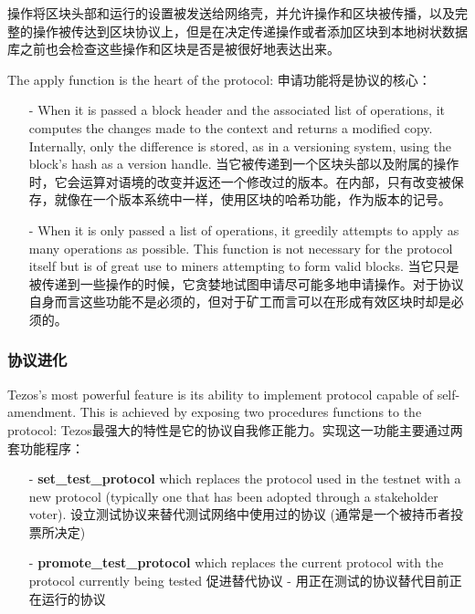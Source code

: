 \documentclass[letterpaper]{article}
\begin{document}
操作将区块头部和运行的设置被发送给网络壳，并允许操作和区块被传播，以及完整的操作被传达到区块协议上，但是在决定传递操作或者添加区块到本地树状数据库之前也会检查这些操作和区块是否是被很好地表达出来。

The apply function is the heart of the protocol:
申请功能将是协议的核心：

\begin{itemize}
\item[-]When it is passed a block header and the associated list of operations,
it computes the changes made to the context and returns a modified copy.
Internally, only the difference is stored, as in a versioning system,
using the block's hash as a version handle.
当它被传递到一个区块头部以及附属的操作时，它会运算对语境的改变并返还一个修改过的版本。在内部，只有改变被保存，就像在一个版本系统中一样，使用区块的哈希功能，作为版本的记号。
\item[-]When it is only passed a list of operations, it greedily attempts
to apply as many operations as possible. This function is not necessary for the
protocol itself but is of great use to miners attempting to form valid blocks.
当它只是被传递到一些操作的时候，它贪婪地试图申请尽可能多地申请操作。对于协议自身而言这些功能不是必须的，但对于矿工而言可以在形成有效区块时却是必须的。
\end{itemize}

\subsubsection{协议进化}

Tezos's most powerful feature is its ability to implement protocol capable
of self-amendment. This is achieved by exposing two procedures functions to the
protocol:
Tezos最强大的特性是它的协议自我修正能力。实现这一功能主要通过两套功能程序：

\begin{itemize}
\item[-] \textbf{set\_test\_protocol} which replaces the protocol
used in the testnet with a new protocol (typically one that has been adopted
through a stakeholder voter).
设立测试协议来替代测试网络中使用过的协议 (通常是一个被持币者投票所决定)
\item[-] \textbf{promote\_test\_protocol} which replaces the current
protocol with the protocol currently being tested
促进替代协议 - 用正在测试的协议替代目前正在运行的协议
\end{itemize}
\end{document}
